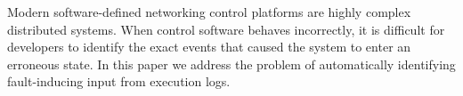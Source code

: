 Modern software-defined networking control platforms are highly complex distributed
systems. When control software behaves incorrectly, it is difficult
for developers to identify the exact events that caused the system to enter
an erroneous state. In this paper we address the problem of automatically
identifying fault-inducing input from execution logs.

%
%
%
%
%
%


